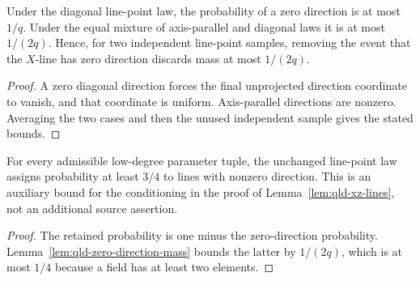 \begin{lemma}
	\label{lem:qld-zero-direction-mass}
	\leanok
	Under the diagonal line-point law, the probability of a zero direction is
	at most $1/q$. Under the equal mixture of axis-parallel and diagonal laws it
	is at most $1/(2q)$. Hence, for two independent line-point samples, removing
	the event that the $X$-line has zero direction discards mass at most
	$1/(2q)$.
\end{lemma}
\begin{proof}
	\leanok
	A zero diagonal direction forces the final unprojected direction coordinate
	to vanish, and that coordinate is uniform. Axis-parallel directions are
	nonzero. Averaging the two cases and then the unused independent sample gives
	the stated bounds.
\end{proof}

\begin{lemma}
	\label{lem:qld-nondegenerate-line-mass}
	\leanok
	For every admissible low-degree parameter tuple, the unchanged line-point
	law assigns probability at least $3/4$ to lines with nonzero direction.
	This is an auxiliary bound for the conditioning in the proof of
	Lemma~\ref{lem:qld-xz-lines}, not an additional source assertion.
\end{lemma}
\begin{proof}
	\leanok
	The retained probability is one minus the zero-direction probability.
	Lemma~\ref{lem:qld-zero-direction-mass} bounds the latter by $1/(2q)$,
	which is at most $1/4$ because a field has at least two elements.
\end{proof}

